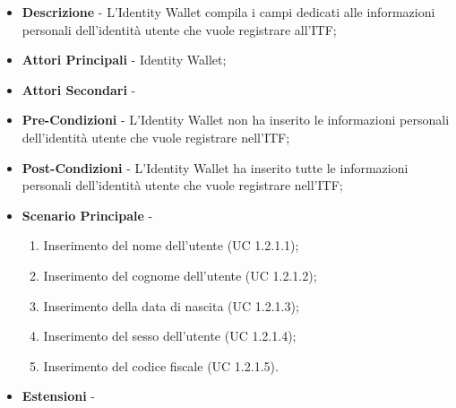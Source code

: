 \begin{itemize}
	\item \textbf{Descrizione} - L'Identity Wallet compila i campi dedicati alle informazioni personali dell'identità utente che vuole registrare all'ITF;
	\item \textbf{Attori Principali} - Identity Wallet;
	\item \textbf{Attori Secondari} -
	\item \textbf{Pre-Condizioni} - L'Identity Wallet non ha inserito le informazioni personali dell'identità utente che vuole registrare nell'\gls{ITF};
	\item \textbf{Post-Condizioni} - L'Identity Wallet ha inserito tutte le informazioni personali dell'identità utente che vuole registrare nell'\gls{ITF};
	\item \textbf{Scenario Principale} -
	\begin{enumerate}
		\item Inserimento del nome dell'utente (UC 1.2.1.1);
		\item Inserimento del cognome dell'utente (UC 1.2.1.2);
		\item Inserimento della data di nascita (UC 1.2.1.3);
		\item Inserimento del sesso dell'utente (UC 1.2.1.4);
		\item Inserimento del codice fiscale (UC 1.2.1.5).
	\end{enumerate}
	\item \textbf{Estensioni} -
\end{itemize}
